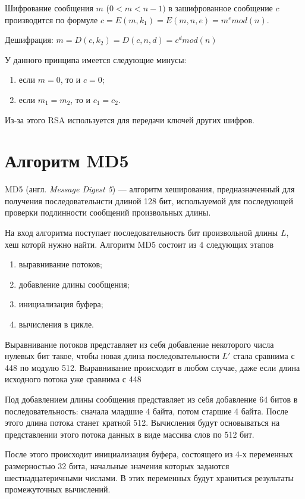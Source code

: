 Шифрование сообщения $m$ ($0 < m < n - 1)$ в зашифрованное сообщение $c$ производится по формуле $ c = E(m, k_1) = E(m, n, e) = m^{e} mod (n)$.

Дешифрация: $m = D(c, k_2) = D(c, n, d) = c^{d} mod (n)$

У данного принципа имеется следующие минусы:
\begin{enumerate}[label=\arabic*)]
	\item если $m = 0$, то и $c = 0$;
	\item если $m_1 = m_2$, то и $c_1 = c_2$.
\end{enumerate}

Из-за этого RSA используется для передачи ключей других шифров.


\section{Алгоритм MD5}

MD5 (англ. \textit{Message Digest 5}) --- алгоритм хеширования, предназначенный для получения последовательнсти длиной 128 бит, используемой для последующей проверки подлинности сообщений произвольных длины.

На вход алгоритма поступает последовательность бит произвольной длины $L$, хеш которй нужно найти. 
Алгоритм MD5 состоит из 4 следующих этапов
\begin{enumerate}[label=\arabic*)]
	\item выравнивание потоков;
    \item добавление длины сообщения;
	\item инициализация буфера;
	\item вычисления в цикле.
\end{enumerate}

Выравнивание потоков представляет из себя добавление некоторого числа нулевых бит такое, чтобы новая длина последовательности $L'$ стала сравнима с 448 по модулю 512. Выравнивание происходит в любом случае, даже если длина исходного потока уже сравнима с 448

Под добавлением длины сообщения представляет из себя добавление 64 битов в последовательность: сначала младшие 4 байта, потом старшие 4 байта. После этого длина потока станет кратной 512. Вычисления будут основываться на представлении этого потока данных в виде массива слов по 512 бит.

После этого происходит инициализация буфера, состоящего из 4-х переменных размерностью 32 бита, начальные значения которых задаются шестнадцатеричными числами.
В этих переменных будут храниться результаты промежуточных вычислений.

